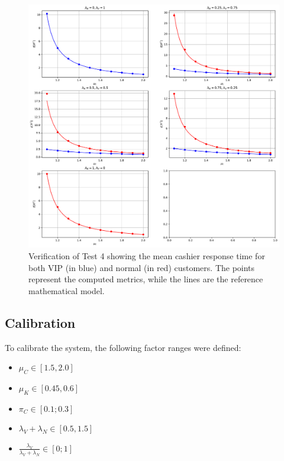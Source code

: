 \begin{figure}[]
    \centering
    \includegraphics[width=\textwidth]{figs/validation.pdf}
    \caption{Verification of Test 4 showing the mean cashier response time for 
        both VIP (in blue) and normal (in red) customers. The points represent the computed metrics, while the lines are the reference mathematical model.}
    \label{fig:validation}
\end{figure}


\subsection{Calibration}
To calibrate the system, the following factor ranges were defined:
\begin{itemize}
\item $\mu_C \in [1.5, 2.0]$
\item $\mu_K \in [0.45, 0.6]$
\item $\pi_C \in [0.1; 0.3]$
\item $\lambda_V+\lambda_N  \in [0.5, 1.5]$
\item $\frac{\lambda_V}{\lambda_V+\lambda_N} \in [0;1]$
\end{itemize}
